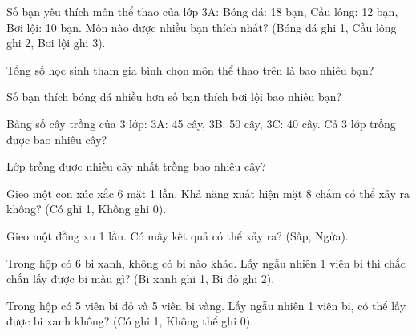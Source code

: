 \begin{ex}
Số bạn yêu thích môn thể thao của lớp 3A: Bóng đá: 18 bạn, Cầu lông: 12 bạn, Bơi lội: 10 bạn. Môn nào được nhiều bạn thích nhất? (Bóng đá ghi 1, Cầu lông ghi 2, Bơi lội ghi 3).
\end{ex}

\begin{ex}
Tổng số học sinh tham gia bình chọn môn thể thao trên là bao nhiêu bạn?
\end{ex}

\begin{ex}
Số bạn thích bóng đá nhiều hơn số bạn thích bơi lội bao nhiêu bạn?
\end{ex}

\begin{ex}
Bảng số cây trồng của 3 lớp: 3A: 45 cây, 3B: 50 cây, 3C: 40 cây. Cả 3 lớp trồng được bao nhiêu cây?
\end{ex}

\begin{ex}
Lớp trồng được nhiều cây nhất trồng bao nhiêu cây?
\end{ex}

\begin{ex}
Gieo một con xúc xắc 6 mặt 1 lần. Khả năng xuất hiện mặt 8 chấm có thể xảy ra không? (Có ghi 1, Không ghi 0).
\end{ex}

\begin{ex}
Gieo một đồng xu 1 lần. Có mấy kết quả có thể xảy ra? (Sấp, Ngửa).
\end{ex}

\begin{ex}
Trong hộp có 6 bi xanh, không có bi nào khác. Lấy ngẫu nhiên 1 viên bi thì chắc chắn lấy được bi màu gì? (Bi xanh ghi 1, Bi đỏ ghi 2).
\end{ex}

\begin{ex}
Trong hộp có 5 viên bi đỏ và 5 viên bi vàng. Lấy ngẫu nhiên 1 viên bi, có thể lấy được bi xanh không? (Có ghi 1, Không thể ghi 0).
\end{ex}

